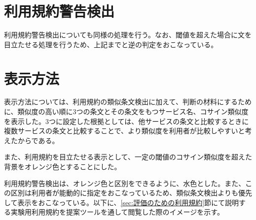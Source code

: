 \section{利用規約警告検出}
利用規約警告検出についても同様の処理を行う。なお、閾値を超えた場合に文を目立たせる処理を行うため、上記までと逆の判定をおこなっている。

\section{表示方法}
表示方法については、利用規約の類似条文検出に加えて、判断の材料にするために、類似度の高い順に3つの条文とその条文をもつサービス名、コサイン類似度を表示した。3つに設定した根拠としては、他サービスの条文と比較するときに複数サービスの条文と比較することで、より類似度を利用者が比較しやすいと考えたからである。

また、利用規約を目立たせる表示として、一定の閾値のコサイン類似度を超えた背景をオレンジ色とすることにした。

利用規約警告検出は、オレンジ色と区別をできるように、水色とした。また、この区別は利用者が能動的に指定をおこなっているため、類似条文検出よりも優先して表示をおこなっている。以下に、\ref{sec:評価のための利用規約}節にて説明する実験用利用規約を提案ツールを通して閲覧した際のイメージを示す。

